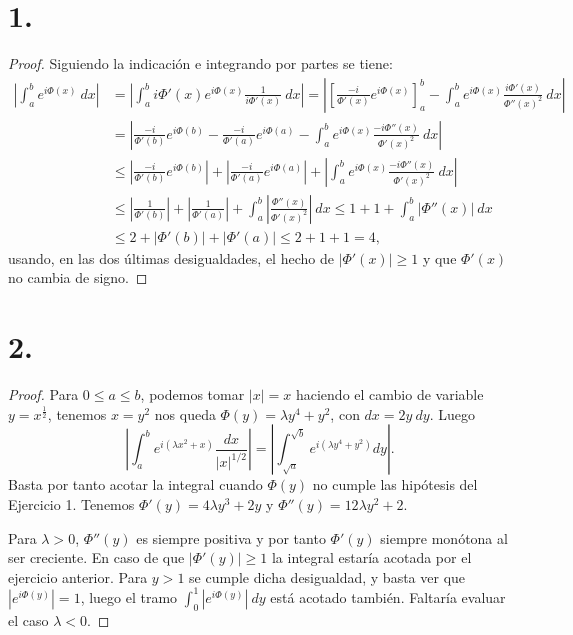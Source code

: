 \documentclass[11pt,a4paper]{article}
\begin{document}
\section*{1.}
\begin{proof}
Siguiendo la indicación e integrando por partes se tiene:
\begin{align*}
    \left|\int_a^b e^{i\Phi(x)} \ dx\right| &= \left|\int_a^b i \Phi'(x) e^{i\Phi(x)} \frac 1{i \Phi'(x)} \ dx\right| = \left| \left[ \frac{-i}{\Phi'(x)} e^{i\Phi(x)}  \right]_a^b - \int_a^b e^{i\Phi(x)} \frac{i \Phi'(x)}{\Phi''(x)^2} \ dx\right| \\ 
    &= \left| \frac{-i}{\Phi'(b)} e^{i\Phi(b)} - \frac{-i}{\Phi'(a)} e^{i\Phi(a)} - \int_a^b e^{i\Phi(x)} \frac{-i\Phi''(x)} {\Phi'(x)^2} \ dx\right| \\
    &\le \left| \frac{-i}{\Phi'(b)} e^{i\Phi(b)} \right| + \left| \frac{-i}{\Phi'(a)} e^{i\Phi(a)} \right| + \left| \int_a^b e^{i\Phi(x)} \frac{-i\Phi''(x)} {\Phi'(x)^2} \ dx \right| \\
    &\le \left| \frac{1}{\Phi'(b)} \right| + \left| \frac{1}{\Phi'(a)} \right| + \int_a^b \left|\frac{\Phi''(x)} {\Phi'(x)^2} \right| \ dx \le 1 + 1 + \int_a^b|\Phi''(x)| \ dx \\
    &\le 2 + |\Phi'(b)| + |\Phi'(a)| \le 2 + 1 + 1 = 4,
\end{align*}
usando, en las dos últimas desigualdades, el hecho de $|\Phi'(x)|\ge 1$ y que $ \Phi'(x) $ no cambia de signo.
\end{proof}

\newpage
\section*{2.}
\begin{proof}
Para $ 0 \leq a \le b $, podemos tomar $ |x| = x $ haciendo el cambio de variable $ y = x^{\frac{1}{2}} $, tenemos $ x = y^2 $ nos queda $\Phi(y) = \lambda y^4 + y^2 $, con $ dx = 2y \ dy $. Luego
$$
\left|\int_a^b e^{i(\lambda x^2+x)}\frac{dx}{|x|^{1/2}}\right| = \left|\int_{\sqrt a}^{ \sqrt b} e^{i(\lambda y^4 + y^2)}dy\right|.
$$
Basta por tanto acotar la integral cuando $ \Phi(y) $ no cumple las hipótesis del Ejercicio 1. Tenemos $ \Phi'(y) = 4\lambda y^3 + 2y$ y $ \Phi''(y) = 12\lambda y^2 + 2$.

\vskip 5mm 
Para $ \lambda > 0 $, $\Phi''(y)$ es siempre positiva y por tanto $ \Phi'(y) $ siempre monótona al ser creciente. En caso de que $ |\Phi'(y)| \ge 1 $ la integral estaría acotada por el ejercicio anterior. Para $ y > 1 $ se cumple dicha desigualdad, y basta ver que $|e^{i\Phi(y)}| = 1 $, luego el tramo $ \int_{0}^{1} |e^{i\Phi(y)}| \ dy $ está acotado también. Faltaría evaluar el caso $ \lambda < 0 $.

\end{proof}
\end{document}
